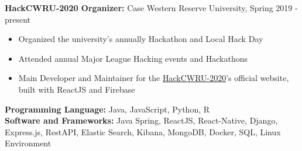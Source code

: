 \documentclass[a4paper,11pt]{article}
\begin{document}
\begin{flushleft}
	
	\textbf{HackCWRU-2020 Organizer: } Case Western Reserve University, Spring 2019 - 
	present
	\vspace{-\topsep}
	\begin{itemize}
		\setlength{\parskip}{2pt}
		\setlength{\itemsep}{0pt plus 1pt}
		\item Organized the university's annually Hackathon and Local Hack Day \\
		\item Attended annual Major League Hacking events and Hackathons
		\item Main Developer and Maintainer for the \href{https://hackcwru.info}{HackCWRU-2020}'s official website, built with ReactJS and Firebase
	\end{itemize}
	
\centering{\noindent\makebox{\rule{8cm}{1.5pt}}}
\end{flushleft} 
\begin{flushleft}
	\textbf{Programming Language:} Java, JavaScript, Python, R \\ 
	\doublespacing
	\textbf{Software and Frameworks:} Java Spring, ReactJS, React-Native, Django, Express.js, RestAPI, Elastic Search, Kibana, MongoDB, Docker, SQL, Linux Environment\\
	\vspace{-\topsep}
	
\end{flushleft}
\end{document}
